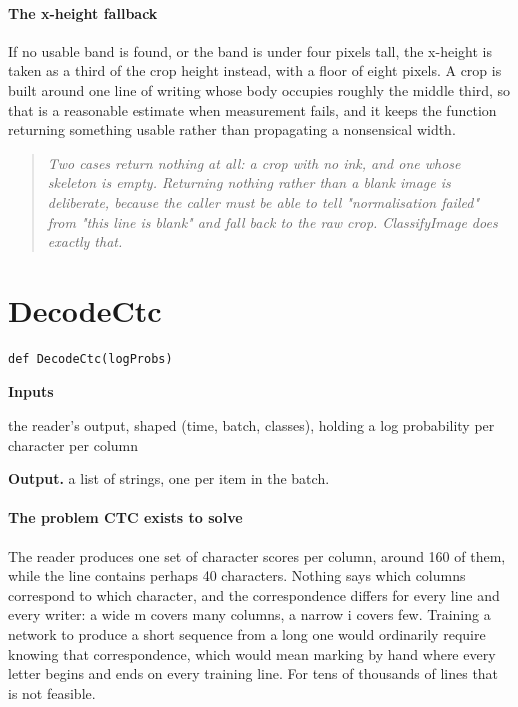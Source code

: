 \paragraph{The x-height fallback}
If no usable band is found, or the band is under four pixels tall, the x-height is taken as a third of the crop height instead, with a floor of eight pixels. A crop is built around one line of writing whose body occupies roughly the middle third, so that is a reasonable estimate when measurement fails, and it keeps the function returning something usable rather than propagating a nonsensical width.


\begin{quote}\small\itshape Two cases return nothing at all: a crop with no ink, and one whose skeleton is empty. Returning nothing rather than a blank image is deliberate, because the caller must be able to tell "normalisation failed" from "this line is blank" and fall back to the raw crop. ClassifyImage does exactly that.\end{quote}

\section{DecodeCtc}
\begin{lstlisting}[style=sig]
def DecodeCtc(logProbs)
\end{lstlisting}

\noindent\textbf{Inputs}
\begin{description}[leftmargin=2.2em,style=nextline,font=\normalfont\ttfamily]\setlength\itemsep{1pt}
  \item[{logProbs}] \normalfont the reader's output, shaped (time, batch, classes), holding a log probability per character per column
\end{description}

\noindent\textbf{Output.} a list of strings, one per item in the batch.


\paragraph{The problem CTC exists to solve}
The reader produces one set of character scores per column, around 160 of them, while the line contains perhaps 40 characters. Nothing says which columns correspond to which character, and the correspondence differs for every line and every writer: a wide m covers many columns, a narrow i covers few. Training a network to produce a short sequence from a long one would ordinarily require knowing that correspondence, which would mean marking by hand where every letter begins and ends on every training line. For tens of thousands of lines that is not feasible.

